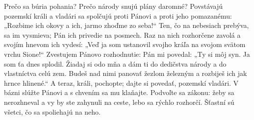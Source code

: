 Prečo sa búria pohania?
Prečo národy snujú plány daromné?
\versseparator
Povstávajú pozemskí králi
a vladári sa spolčujú
proti Pánovi a proti jeho pomazanému:
\versseparator
„Rozbime ich okovy
a ich, jarmo zhoďme zo seba!“
\versseparator
Ten, čo na nebesiach prebýva, sa im vysmieva;
Pán ich privedie na posmech.
\versseparator
Raz na nich rozhorčene zavolá
a svojím hnevom ich vydesí:
\versseparator
„Veď ja som ustanovil svojho kráľa
na svojom svätom vrchu Sione!“
Zvestujem Pánovo rozhodnutie:
\versseparator
Pán mi povedal: „Ty si môj syn.
Ja som ťa dnes splodil.
\versseparator
Žiadaj si odo mňa a dám ti do dedičstva národy
a do vlastníctva celú zem.
\versseparator
Budeš nad nimi panovať žezlom železným
a rozbiješ ich jak hrnce hlinené.“
\versseparator
A teraz, králi, pochopte;
dajte si povedať, pozemskí vladári.
\versseparator
V bázni slúžte Pánovi
a s chvením sa mu klaňajte.
\versseparator
Podvoľte sa zákonu: žeby sa nerozhneval
a vy by ste zahynuli na ceste,
\versseparator
lebo sa rýchlo rozhorčí.
Šťastní sú všetci, čo sa spoliehajú na neho. 
